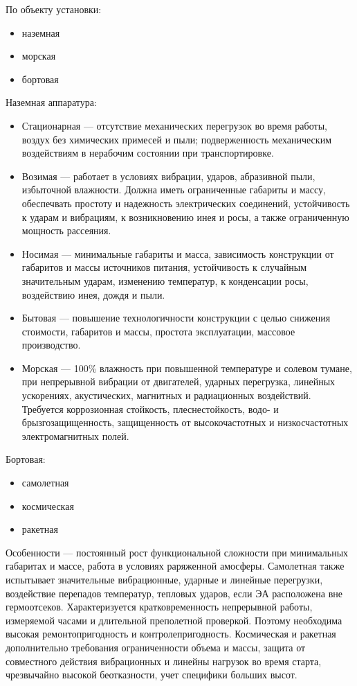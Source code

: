 \documentclass{article}
\begin{document}
По объекту установки: 
\begin{itemize}
	\item наземная
	\item морская
	\item бортовая

\end{itemize}
Наземная аппаратура: 
\begin{itemize}
	\item Стационарная --- отсутствие механических перегрузок во время работы, воздух без химических примесей и пыли; подверженность механическим воздействиям в нерабочим состоянии при транспортировке.
	\item Возимая --- работает в условиях вибрации, ударов, абразивной пыли, избыточной влажности. Должна иметь ограниченные габариты и массу, обеспечвать простоту и надежность электрических соединений, устойчивость к ударам и вибрациям, к возникновению инея и росы, а также ограниченную мощность рассеяния.
	\item Носимая --- минимальные габариты и масса, зависимость конструкции от габаритов и массы источников питания, устойчивость к случайным значительным ударам, изменению температур, к конденсации росы, воздействию инея, дождя и пыли.
	\item Бытовая --- повышение технологичности конструкции с целью снижения стоимости, габаритов и массы, простота эксплуатации, массовое производство.
	\item Морская --- 100\% влажность при повышенной температуре и солевом тумане, при непрерывной вибрации от двигателей, ударных перегрузка, линейных ускорениях, акустических, магнитных и радиационных воздействий. Требуется коррозионная стойкость, плеснестойкость, водо- и брызгозащищенность, защищенность от высокочастотных и низкосчастотных электромагнитных полей.
\end{itemize}
Бортовая: 
\begin{itemize}
	\item самолетная
	\item космическая
	\item ракетная
\end{itemize}
Особенности --- постоянный рост функциональной сложности при минимальных габаритах и массе, работа в условиях раряженной амосферы.
Самолетная также испытывает значительные вибрационные, ударные и линейные перегрузки, воздействие перепадов температур, тепловых ударов, если ЭА расположена вне гермоотсеков. Характеризуется кратковременность непрерывной работы, измеряемой часами и длительной преполетной проверкой. Поэтому необходима высокая ремонтопригодность и контролепригодность.
Космическая и ракетная дополнительно требования ограниченности объема и массы, защита от совместного действия вибрационных и линейны нагрузок во время старта, чрезвычайно высокой беотказности, учет специфики больших высот.
\end{document}
